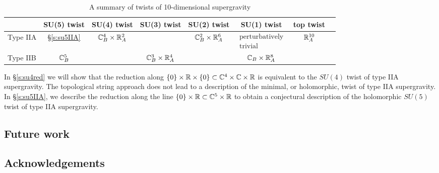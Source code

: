 \begin{table}[]
\begin{tabular}{c|c|c|c|c|c|c|c|}
\cline{2-7}
& SU(5) twist & SU(4) twist & SU(3) twist & SU(2) twist & SU(1) twist & top twist  \\ \hline
\multicolumn{1}{|l|}{Type IIA} & \S \ref{s:su5IIA} & $\mathbb C^4_B \times \mathbb R^2_A$ & & $\mathbb C^2_B \times \mathbb R^6_A$ & $\begin{matrix} \text{perturbatively} \\ \text{trivial} \end{matrix}$ & $\mathbb R^{10}_A$  \\ \hline
\multicolumn{1}{|l|}{Type IIB} & $\mathbb C^5_B$ & & $\mathbb C^3_B \times \mathbb R^4_A$ & & $\mathbb C_B \times \mathbb R^8_A$ & \\ \hline
\end{tabular}
\caption{A summary of twists of 10-dimensional supergravity}
\label{table:IIsugra}
\end{table}

In \S \ref{s:su4red} we will show that the reduction along $\{0\} \times \mathbb R \times \{0\} \subset \mathbb C^4 \times \mathbb C \times \mathbb R$ is equivalent to the $SU(4)$ twist of type IIA supergravity. 
The topological string approach does not lead to a description of the minimal, or holomorphic, twist of type IIA supergravity. 
In \S \ref{s:su5IIA}, we describe the reduction along the line $\{0\} \times \mathbb R \subset \mathbb C^5 \times \mathbb R$ to obtain a conjectural description of the holomorphic $SU(5)$ twist of type IIA supergravity. 


\subsection*{Future work} 

\subsection*{Acknowledgements}


%

